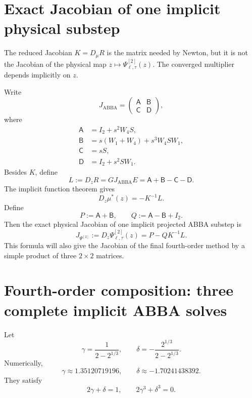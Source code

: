 \documentclass[11pt,a4paper]{article}
\newcommand{\ABBA}{\operatorname{ABBA}}
\newcommand{\Id}{I_2}
\newcommand{\Psitwo}{\Psi^{[2]}}
\begin{document}
\section{Exact Jacobian of one implicit physical substep}
The reduced Jacobian $K=D_\mu R$ is the matrix needed by Newton, but it is not the Jacobian of the physical map $z\mapsto\Psitwo_{\ell,\tau}(z)$. The converged multiplier depends implicitly on $z$.

Write
\begin{equation}
    J_{\ABBA}
    =\begin{pmatrix}\mathsf A&\mathsf B\\\mathsf C&\mathsf D\end{pmatrix},
\end{equation}
where
\begin{align}
    \mathsf A&=\Id+s^2W_4S,\\
    \mathsf B&=s(W_1+W_4)+s^3W_4SW_1,\\
    \mathsf C&=sS,\\
    \mathsf D&=\Id+s^2SW_1.
\end{align}
Besides $K$, define
\begin{equation}
    L:=D_zR=GJ_{\ABBA}E
    =\mathsf A+\mathsf B-\mathsf C-\mathsf D.
\end{equation}
The implicit function theorem gives
\begin{equation}
    D_z\mu^*(z)=-K^{-1}L.
\end{equation}
Define
\begin{equation}
    P:=\mathsf A+\mathsf B,
    \qquad
    Q:=\mathsf A-\mathsf B+\Id.
\end{equation}
Then the exact physical Jacobian of one implicit projected ABBA substep is
\begin{equation}
    \boxed{
    J_{\Psitwo}
    :=D_z\Psitwo_{\ell,\tau}(z)
    =P-QK^{-1}L.
    }
    \label{eq:physicalJ}
\end{equation}
This formula will also give the Jacobian of the final fourth-order method by a simple product of three $2\times2$ matrices.

\section{Fourth-order composition: three complete implicit ABBA solves}
Let
\begin{equation}
    \boxed{
    \gamma=\frac{1}{2-2^{1/3}},
    \qquad
    \delta=-\frac{2^{1/3}}{2-2^{1/3}}.
    }
    \label{eq:coefficients}
\end{equation}
Numerically,
\begin{equation}
    \gamma\approx1.35120719196,
    \qquad
    \delta\approx-1.70241438392.
\end{equation}
They satisfy
\begin{equation}
    2\gamma+\delta=1,
    \qquad
    2\gamma^3+\delta^3=0.
    \label{eq:orderconditions}
\end{equation}
\end{document}
